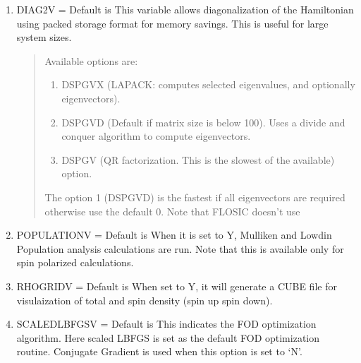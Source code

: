 \documentclass[letterpaper,10pt,english,openany,oneside]{sphinxmanual}
\begin{document}
\begin{enumerate}
\item {} 
\sphinxAtStartPar
DIAG2V        =    Default is 
This variable allows diagonalization of the Hamiltonian using packed storage format for memory savings. This is useful for large system sizes.
\begin{quote}

\sphinxAtStartPar
Available options are:
\begin{enumerate}
%
\setcounter{enumii}{-1}
\item {} 
\sphinxAtStartPar
DSPGVX (LAPACK: computes selected eigenvalues, and optionally eigenvectors).

\item {} 
\sphinxAtStartPar
DSPGVD (Default if matrix size is below 100).  Uses a divide and conquer algorithm to compute eigenvectors.

\item {} 
\sphinxAtStartPar
DSPGV (QR\sphinxhyphen{} factorization. This is the slowest of the available) option.

\end{enumerate}

\sphinxAtStartPar
The option 1 (DSPGVD) is the fastest if all eigenvectors are required otherwise use the default 0.
Note that FLOSIC doesn’t use 
\end{quote}

\item {} 
\sphinxAtStartPar
POPULATIONV   = Default is 
When it is set to Y, Mulliken and Lowdin Population analysis calculations are run. Note that this is available only for spin polarized calculations.

\item {} 
\sphinxAtStartPar
RHOGRIDV  = Default is 
When set to Y,  it will generate a CUBE file for visulaization of total and spin density (spin up \sphinxhyphen{} spin down).

\item {} 
\sphinxAtStartPar
SCALEDLBFGSV  = Default is 
This indicates the FOD optimization algorithm. Here scaled LBFGS is set as the default FOD optimization routine. Conjugate Gradient is used when this option is set to ‘N’.

\end{enumerate}

\sphinxstepscope
\end{document}

